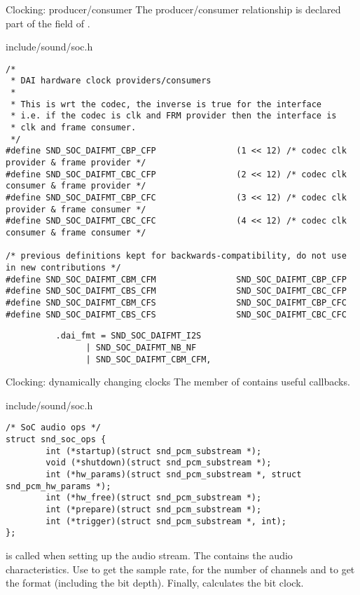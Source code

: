 \begin{frame}[fragile]{Clocking: producer/consumer}
  The producer/consumer relationship is declared part of the
   field of .
  \begin{block}{include/sound/soc.h}
    \fontsize{6}{6}\selectfont
    \begin{verbatim}
/*
 * DAI hardware clock providers/consumers
 *
 * This is wrt the codec, the inverse is true for the interface
 * i.e. if the codec is clk and FRM provider then the interface is
 * clk and frame consumer.
 */
#define SND_SOC_DAIFMT_CBP_CFP                (1 << 12) /* codec clk provider & frame provider */
#define SND_SOC_DAIFMT_CBC_CFP                (2 << 12) /* codec clk consumer & frame provider */
#define SND_SOC_DAIFMT_CBP_CFC                (3 << 12) /* codec clk provider & frame consumer */
#define SND_SOC_DAIFMT_CBC_CFC                (4 << 12) /* codec clk consumer & frame consumer */

/* previous definitions kept for backwards-compatibility, do not use in new contributions */
#define SND_SOC_DAIFMT_CBM_CFM                SND_SOC_DAIFMT_CBP_CFP
#define SND_SOC_DAIFMT_CBS_CFM                SND_SOC_DAIFMT_CBC_CFP
#define SND_SOC_DAIFMT_CBM_CFS                SND_SOC_DAIFMT_CBP_CFC
#define SND_SOC_DAIFMT_CBS_CFS                SND_SOC_DAIFMT_CBC_CFC
    \end{verbatim}
  \end{block}
  \begin{block}{}
    \fontsize{9}{9}\selectfont
    \begin{verbatim}
          .dai_fmt = SND_SOC_DAIFMT_I2S
                | SND_SOC_DAIFMT_NB_NF
                | SND_SOC_DAIFMT_CBM_CFM,
    \end{verbatim}
  \end{block}
\end{frame}

\begin{frame}[fragile]{Clocking: dynamically changing clocks}
  The  member of  contains
  useful callbacks.
  \begin{block}{include/sound/soc.h}
    \fontsize{10}{10}\selectfont
    \begin{verbatim}
/* SoC audio ops */
struct snd_soc_ops {
        int (*startup)(struct snd_pcm_substream *);
        void (*shutdown)(struct snd_pcm_substream *);
        int (*hw_params)(struct snd_pcm_substream *, struct snd_pcm_hw_params *);
        int (*hw_free)(struct snd_pcm_substream *);
        int (*prepare)(struct snd_pcm_substream *);
        int (*trigger)(struct snd_pcm_substream *, int);
};
    \end{verbatim}
  \end{block}
   is called when setting up the audio stream. The
   contains the audio characteristics.
  Use  to get the sample rate,
   for the number of channels and
   to get the format (including the bit depth).
  Finally,  calculates the bit clock.
\end{frame}

